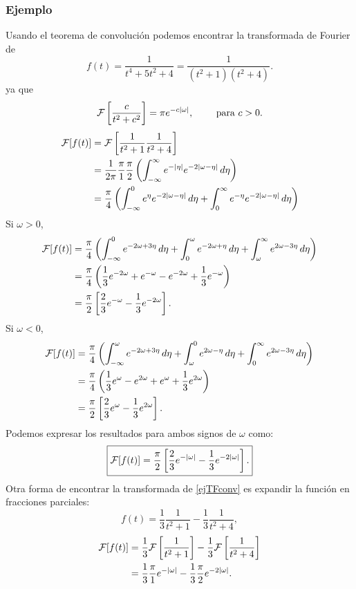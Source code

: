 \subsubsection{Ejemplo} Usando el teorema de convolución podemos encontrar la transformada de Fourier de 
\begin{equation}\label{ejTFconv}
 f(t) =\frac{1}{t^4 + 5 t^2 + 4} = \frac{1}{(t^2+1)(t^2+4)}.
\end{equation}
ya que
\begin{equation}
{\cal F}\left[\frac{c}{t^2+c^2}\right] = \pi e^{-c |\omega|},\qquad\text{ para }c > 0. 
\end{equation}
\begin{align}
{\cal F}[f(t)]
 &={\cal F}\left[\frac{1}{t^2+1}\frac{1}{t^2+4}\right] 
\\
 &=\frac{1}{2\pi}\frac{\pi}{1}\frac{\pi}{2}\left(\int_{-\infty}^\infty e^{-|\eta|} e^{-2|\omega -\eta|}\,d\eta\right) 
\\
 &=\frac{\pi}{4}\left(\int_{-\infty}^0 e^\eta e^{-2|\omega -\eta|}\,d\eta
 +\int_0^\infty e^{-\eta} e^{-2|\omega -\eta|}\,d\eta\right)
\end{align}
Si $\omega > 0$,
\begin{align}
{\cal F}[f(t)]
 &=\frac{\pi}{4}\left(\int_{-\infty}^0 e^{-2\omega + 3\eta}\,d\eta
 +\int_0^\omega e^{-2\omega +\eta}\,d\eta
 +\int_\omega^\infty e^{2\omega - 3\eta}\,d\eta\right) 
\\
 &=\frac{\pi}{4}\left(\frac{1}{3} e^{-2\omega} + e^{-\omega}
 - e^{-2\omega} +\frac{1}{3} e^{-\omega}\right) 
\\
 &=\frac{\pi}{2}\left[ \frac{2}{3}e^{-\omega} -\frac{1}{3} e^{-2\omega}\right].
\end{align}
Si $\omega < 0$,
\begin{align}
{\cal F}[f(t)]
 &=\frac{\pi}{4}\left(\int_{-\infty}^\omega e^{-2\omega+3\eta}\,d\eta
 +\int_\omega^0 e^{2\omega -\eta}\,d\eta
 +\int_0^\infty e^{2\omega-3\eta}\,d\eta\right) 
\\
 &=\frac{\pi}{4}\left(\frac{1}{3} e^\omega - e^{2\omega}
 + e^\omega +\frac{1}{3} e^{2\omega}\right)\\
 &=\frac{\pi}{2}\left[\frac{2}{3}e^\omega -\frac{1}{3} e^{2\omega} \right].
\end{align}
Podemos expresar los resultados para ambos signos de $\omega$ como:
\begin{equation}
\boxed{ 
{\cal F}[f(t)] =\frac{\pi}{2}\left[\frac{2}{3} e^{-|\omega|} -\frac{1}{3} e^{-2|\omega|} \right].
 } 
\end{equation} 
Otra forma de encontrar la transformada de \eqref{ejTFconv} es expandir la función en fracciones parciales:
\begin{equation}
f(t) =\frac{1}{3}\frac{1}{t^2 + 1} -\frac{1}{3}\frac{1}{t^2 + 4},
\end{equation}
\begin{align}
{\cal F}[f(t)]
&=\frac{1}{3}{\cal F}\left[\frac{1}{t^2 + 1}\right]
-\frac{1}{3}{\cal F}\left[\frac{1}{t^2+4}\right]\\
&=\frac{1}{3}\frac{\pi}{1} e^{-|\omega|} -\frac{1}{3}\frac{\pi}{2} e^{-2|\omega|}.
\end{align}        

